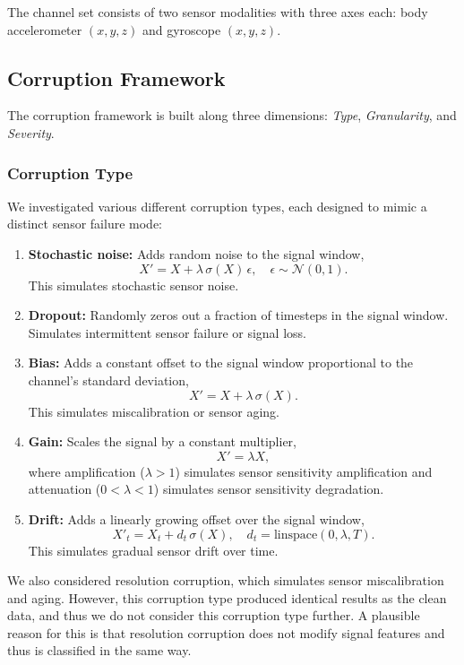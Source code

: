 The channel set consists of two sensor modalities with three axes each: body accelerometer
$(x,y,z)$ and gyroscope $(x,y,z)$.

\subsection{Corruption Framework}
The corruption framework is built along three dimensions: \textit{Type}, \textit{Granularity},
and \textit{Severity}.

\subsubsection{Corruption Type}
We investigated various different corruption types, each designed to mimic a distinct sensor failure mode:

\begin{enumerate}
    \item \textbf{Stochastic noise:} Adds random noise to the signal window,
    \[
    X' = X + \lambda\,\sigma(X)\,\epsilon, \quad \epsilon \sim \mathcal{N}(0,1).
    \]
    This simulates stochastic sensor noise.

    \item \textbf{Dropout:} Randomly zeros out a fraction of timesteps in the signal window.
    Simulates intermittent sensor failure or signal loss.

    \item \textbf{Bias:} Adds a constant offset to the signal window proportional to the channel's standard deviation,
    \[
    X' = X + \lambda\,\sigma(X).
    \]
    This simulates miscalibration or sensor aging.

    \item \textbf{Gain:} Scales the signal by a constant multiplier,
    \[
    X' = \lambda X,
    \]
    where amplification ($\lambda > 1$) simulates sensor sensitivity amplification and
    attenuation ($0 < \lambda < 1$) simulates sensor sensitivity degradation.
    \item \textbf{Drift:} Adds a linearly growing offset over the signal window,
    \[
    X'_t = X_t + d_t\,\sigma(X), \quad d_t = \text{linspace}(0,\lambda,T).
    \]
    This simulates gradual sensor drift over time.
\end{enumerate}
We also considered resolution corruption, which simulates sensor miscalibration and aging. However,
this corruption type produced identical results as the clean data, and thus we do not consider this corruption
type further. A plausible reason for this is that resolution corruption does not modify signal features and
thus is classified in the same way.


